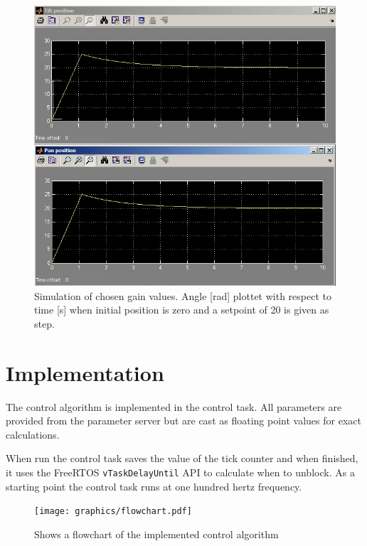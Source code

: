 \begin{figure}[htb]
	\centering
	\includegraphics[width=\textwidth,trim=0 0 0 0]{graphics/screensh_pid.jpg} %
	\caption{Simulation of chosen gain values. Angle [rad] plottet with respect to time [s] when initial position is zero and a setpoint of 20 is given as step.}
	\label{fig:chosen_plot}			%
\end{figure}

\section{Implementation}
The control algorithm is implemented in the control task. All parameters are provided from the parameter server but are cast as  floating point values for exact calculations.

When run the control task saves the value of the tick counter and when finished, it uses the FreeRTOS \texttt{vTaskDelayUntil} API to calculate when to unblock. As a starting point the control task runs at one hundred hertz frequency.

\begin{figure}[htb]
	\begin{center}
	\texttt{[image: graphics/flowchart.pdf]}
	\caption{Shows a flowchart of the implemented control algorithm}
	\label{fig:pid_flow}			
	\end{center}
\end{figure}

